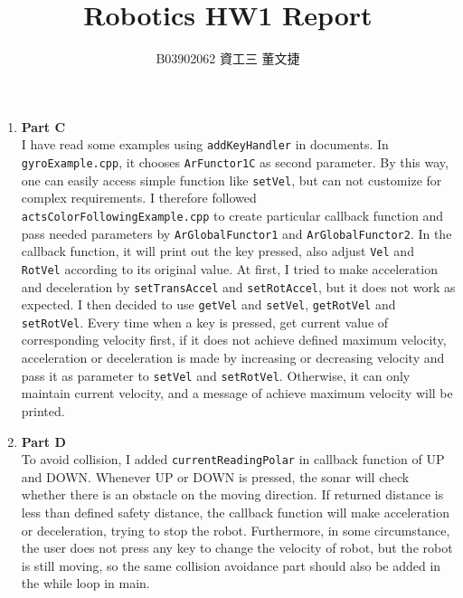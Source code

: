 \documentclass[12pt, a4paper]{article}
\date{}
\title{\vspace{-3.0cm} Robotics HW1 Report \\ \vspace{0.5cm}}
\author{\normalsize B03902062 資工三 \hspace{0cm} 董文捷}
\begin{document}
\maketitle
\begin{enumerate}[1.]

\item
{\bf Part C} \\
I have read some examples using \texttt{addKeyHandler} in documents. In \\ \texttt{gyroExample.cpp}, it chooses \texttt{ArFunctor1C} as second parameter. By this way, one can easily access simple function like \texttt{setVel}, but can not customize for complex requirements. I therefore followed \\ \texttt{actsColorFollowingExample.cpp} to create particular callback function and pass needed parameters by \texttt{ArGlobalFunctor1} and \texttt{ArGlobalFunctor2}. In the callback function, it will print out the key pressed, also adjust \texttt{Vel} and \texttt{RotVel} according to its original value. At first, I tried to make acceleration and deceleration by \texttt{setTransAccel} and \texttt{setRotAccel}, but it does not work as expected. I then decided to use \texttt{getVel} and \texttt{setVel}, \texttt{getRotVel} and \texttt{setRotVel}. Every time when a key is pressed, get current value of corresponding velocity first, if it does not achieve defined maximum velocity, acceleration or deceleration is made by increasing or decreasing velocity and pass it as parameter to \texttt{setVel} and \texttt{setRotVel}. Otherwise, it can only maintain current velocity, and a message of achieve maximum velocity will be printed.

\item
{\bf Part D} \\
To avoid collision, I added \texttt{currentReadingPolar} in callback function of UP and DOWN. Whenever UP or DOWN is pressed, the sonar will check whether there is an obstacle on the moving direction. If returned distance is less than defined safety distance, the callback function will make acceleration or deceleration, trying to stop the robot. Furthermore, in some circumstance, the user does not press any key to change the velocity of robot, but the robot is still moving, so the same collision avoidance part should also be added in the while loop in main.
    

\end{enumerate}
\end{document}
